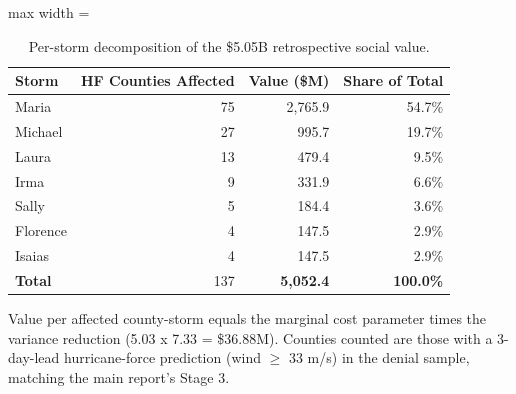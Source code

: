 \begin{table}

\caption{Per-storm decomposition of the \$5.05B retrospective social value. \label{tab:appC_per_storm}}
\centering
\begin{adjustbox}{max width = \textwidth}
\begin{threeparttable}
\begin{tabular}[t]{lrrr}
\toprule
Storm & HF Counties Affected & Value (\$M) & Share of Total\\
\midrule
Maria & 75 & 2,765.9 & 54.7\%\\
Michael & 27 & 995.7 & 19.7\%\\
Laura & 13 & 479.4 & 9.5\%\\
Irma & 9 & 331.9 & 6.6\%\\
Sally & 5 & 184.4 & 3.6\%\\
Florence & 4 & 147.5 & 2.9\%\\
Isaias & 4 & 147.5 & 2.9\%\\
\textbf{Total} & 137 & \textbf{5,052.4} & \textbf{100.0\%}\\
\bottomrule
\end{tabular}
\begin{tablenotes}
\small
\item Value per affected county-storm equals the marginal cost parameter times the variance reduction (5.03 x 7.33 = \$36.88M). Counties counted are those with a 3-day-lead hurricane-force prediction (wind $\geq$ 33 m/s) in the denial sample, matching the main report's Stage 3.
\end{tablenotes}
\end{threeparttable}
\end{adjustbox}
\end{table}
